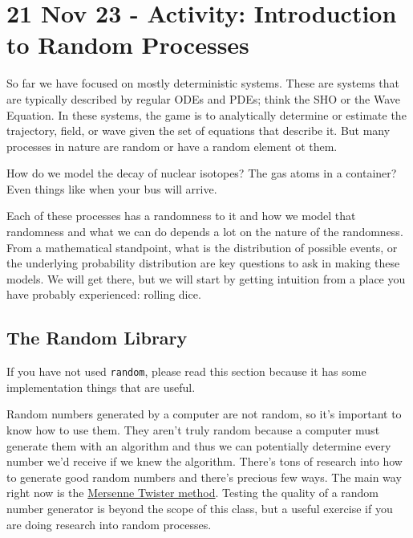 \section{21 Nov 23 - Activity: Introduction to Random
Processes}\label{nov-23---activity-introduction-to-random-processes}

So far we have focused on mostly deterministic systems. These are
systems that are typically described by regular ODEs and PDEs; think the
SHO or the Wave Equation. In these systems, the game is to analytically
determine or estimate the trajectory, field, or wave given the set of
equations that describe it. But many processes in nature are random or
have a random element ot them.

How do we model the decay of nuclear isotopes? The gas atoms in a
container? Even things like when your bus will arrive.

Each of these processes has a randomness to it and how we model that
randomness and what we can do depends a lot on the nature of the
randomness. From a mathematical standpoint, what is the distribution of
possible events, or the underlying probability distribution are key
questions to ask in making these models. We will get there, but we will
start by getting intuition from a place you have probably experienced:
rolling dice.

\begin{Shaded}
\begin{Highlighting}[]
\end{Highlighting}
\end{Shaded}

\subsection{The Random Library}\label{the-random-library}

If you have not used \texttt{random}, please read this section because
it has some implementation things that are useful.

Random numbers generated by a computer are not random, so it's important
to know how to use them. They aren't truly random because a computer
must generate them with an algorithm and thus we can potentially
determine every number we'd receive if we knew the algorithm. There's
tons of research into how to generate good random numbers and there's
precious few ways. The main way right now is the
\href{https://en.wikipedia.org/wiki/Mersenne_Twister}{Mersenne Twister
method}. Testing the quality of a random number generator is beyond the
scope of this class, but a useful exercise if you are doing research
into random processes.


